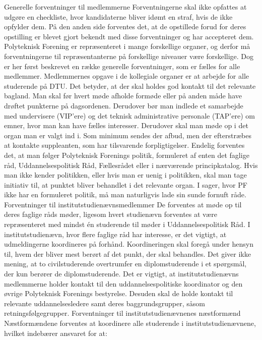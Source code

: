 Generelle forventninger til medlemmerne
Forventningerne skal ikke opfattes at udgøre en checkliste, hvor kandidaterne bliver idømt en straf, hvis de ikke
opfylder dem. På den anden side forventes det, at de opstillede forud for deres opstilling er blevet gjort bekendt med
disse forventninger og har accepteret dem.
Polyteknisk Forening er repræsenteret i mange forskellige organer, og derfor må forventningerne til repræsentanterne på
forskellige niveauer være forskellige. Dog er her først beskrevet en række generelle forventninger, som er fælles for alle
medlemmer.
Medlemmernes opgave i de kollegiale organer er at arbejde for alle studerende på DTU. Det betyder, at der skal holdes
god kontakt til det relevante bagland. Man skal før hvert møde afholde formøde eller på anden måde have drøftet
punkterne på dagsordenen.
Derudover bør man indlede et samarbejde med undervisere (VIP’ere) og det teknisk administrative personale (TAP’ere)
om emner, hvor man kan have fælles interesser.
Derudover skal man møde op i det organ man er valgt ind i. Som minimum sendes der afbud, men der efterstræbes at
kontakte suppleanten, som har tilsvarende forpligtigelser.
Endelig forventes det, at man følger Polyteknisk Forenings politik, formuleret af enten det faglige råd,
Uddannelsespolitisk Råd, Fællesrådet eller i nærværende principkatalog. Hvis man ikke kender politikken, eller hvis
man er uenig i politikken, skal man tage initiativ til, at punktet bliver behandlet i det relevante organ. I sager, hvor PF
ikke har en formuleret politik, må man naturligvis lade sin sunde fornuft råde.
Forventninger til institutstudienævnsmedlemmer
De forventes at møde op til deres faglige råds møder, ligesom hvert studienævn forventes at være repræsenteret med
mindst én studerende til møder i Uddannelsespolitisk Råd.
I institutstudienævn, hvor flere faglige råd har interesse, er det vigtigt, at udmeldingerne koordineres på forhånd.
Koordineringen skal foregå under hensyn til, hvem der bliver mest berørt af det punkt, der skal behandles. Det giver
ikke mening, at to civilstuderende overtrumfer en diplomstuderende i et spørgsmål, der kun berører de
diplomstuderende.
Det er vigtigt, at institutstudienævns medlemmerne holder kontakt til den uddannelsespolitiske koordinator og den
øvrige Polyteknisk Forenings bestyrelse. Desuden skal de holde kontakt til relevante uddannelsesledere samt deres
baggrundsgrupper, såsom retningsfølgegrupper.
Forventninger til institutstudienævnenes næstformænd
Næstformændene forventes at koordinere alle studerende i institutstudienævnene, hvilket indebærer ansvaret for at:
